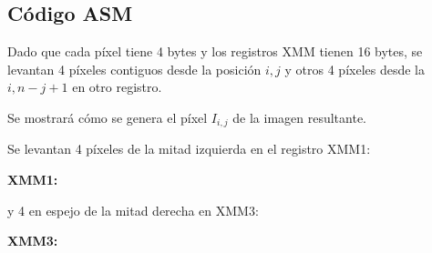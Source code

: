 \subsection{Código ASM}
\par{Dado que cada píxel tiene 4 bytes y los registros XMM tienen 16 bytes, se levantan 4 píxeles contiguos desde la posición $i,j$ y otros 4 píxeles desde la $i, n-j+1$ en otro registro.}
\par{Se mostrará cómo se genera el píxel $I_{i,j}$ de la imagen resultante.}
\par{Se levantan 4 píxeles de la mitad izquierda en el registro XMM1:}
\\
\par{\textbf{XMM1:}}
\par{y 4 en espejo de la mitad derecha en XMM3:}\\
\par{\textbf{XMM3:}}


